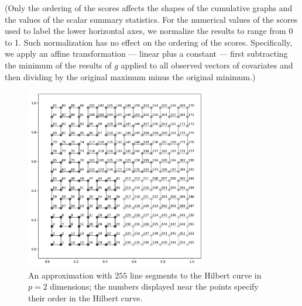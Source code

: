 \documentclass[]{fairmeta}
\begin{document}
(Only the ordering of the scores affects the shapes of the cumulative graphs
and the values of the scalar summary statistics.
For the numerical values of the scores used to label the lower horizontal axes,
we normalize the results to range from 0 to 1.
Such normalization has no effect on the ordering of the scores.
Specifically, we apply an affine transformation --- linear plus a constant ---
first subtracting the minimum of the results of $g$
applied to all observed vectors of covariates
and then dividing by the original maximum minus the original minimum.)


\begin{figure}
\begin{centering}
\hfil\parbox{0.71\textwidth}
{\includegraphics[width=0.71\textwidth]{./hilbert.pdf}}
\end{centering}
\caption{An approximation with $255$ line segments to the Hilbert curve
in $p = 2$ dimensions; the numbers displayed near the points
specify their order in the Hilbert curve.}
\label{hilbert}
\end{figure}



\clearpage





\end{document}
